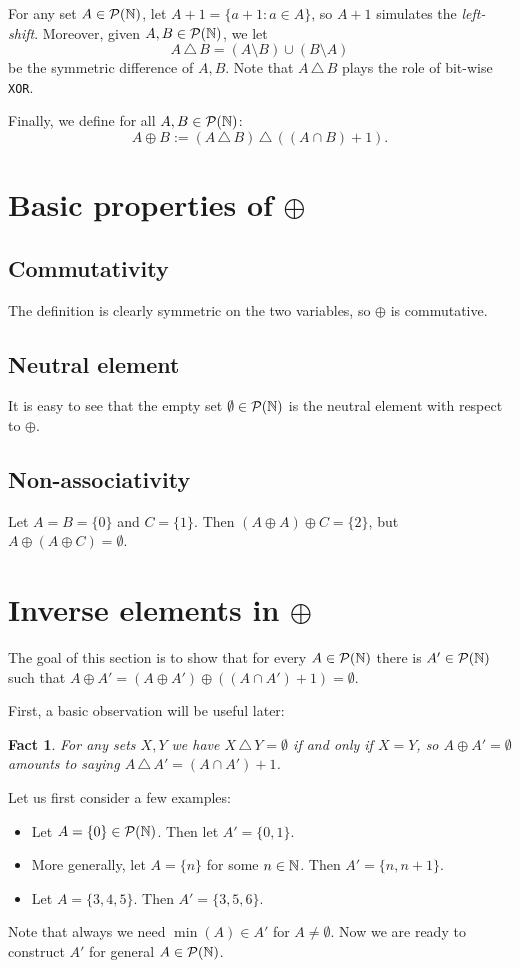 \documentclass[12pt]{amsart}
\newtheorem{fact}[lemma]{\bf Fact}
\begin{document}
For any set $A\in\mathcal{P}(\mathbb{N})$, let $A+1 = \{a+1: a\in A\}$, so $A+1$ simulates the 
{\em left-shift}. Moreover, given $A, B\in\mathcal{P}(\mathbb{N})$, we let 
$$A\, \triangle \, B = (A\setminus B)\cup (B\setminus A)$$ be the symmetric difference
of $A, B$. Note that $A\, \triangle \, B$ plays the role of bit-wise {\tt XOR}.

Finally, we define for all $A,B \in \mathcal{P}(\mathbb{N})$: $$A\oplus B := (A \, \triangle \,
B)\, \triangle \, ((A \cap B) + 1).$$
\section{Basic properties of $\oplus$}

\subsection{Commutativity} The definition is clearly symmetric on the two 
variables,
so $\oplus$ is commutative.

\subsection{Neutral element} It is easy to see that the empty set $\emptyset 
\in \mathcal{P}(\mathbb{N})$ is the neutral element with respect to $\oplus$.

\subsection{Non-associativity} Let $A = B = \{0\}$ and $C = \{1\}$. Then
$(A \oplus A)\oplus C = \{2\}$, but $A \oplus (A \oplus C) = \emptyset$. 

\section{Inverse elements in $\oplus$}

The goal of this section is to show that for every $A\in \mathcal{P}(\mathbb{N})$ there is $A'\in 
\mathcal{P}(\mathbb{N})$ such
that $A \oplus A'  = (A\oplus A') \oplus ((A\cap A') + 1) = \emptyset$.

First, a basic observation will be useful later:
\begin{fact}\label{basicfact}
{\em For any sets $X, Y$ we have $X\, \triangle \, Y = \emptyset$ if and 
only if $X = Y$, so $A \oplus A' = \emptyset$ amounts to saying $A\, 
\triangle \, A' =  (A\cap A')+1$.}
\end{fact}

Let us first consider a few examples:
\begin{itemize}
	\item Let $A = \{0\} \in \mathcal{P}(\mathbb{N})$. Then let $A' = \{0,1\}$. 
	\item More generally, let $A = \{n\}$ for some $n\in\mathbb{N}$. Then $A' = 
	\{n,n+1\}$.
	\item Let $A = \{3, 4, 5\}$. Then $A' = \{3, 5, 6\}$. 
\end{itemize}
Note that always we need $\min(A)\in A'$ for $A \neq \emptyset$. Now we are 
ready to construct $A'$ for general $A\in \mathcal{P}(\mathbb{N})$. 
\end{document}
